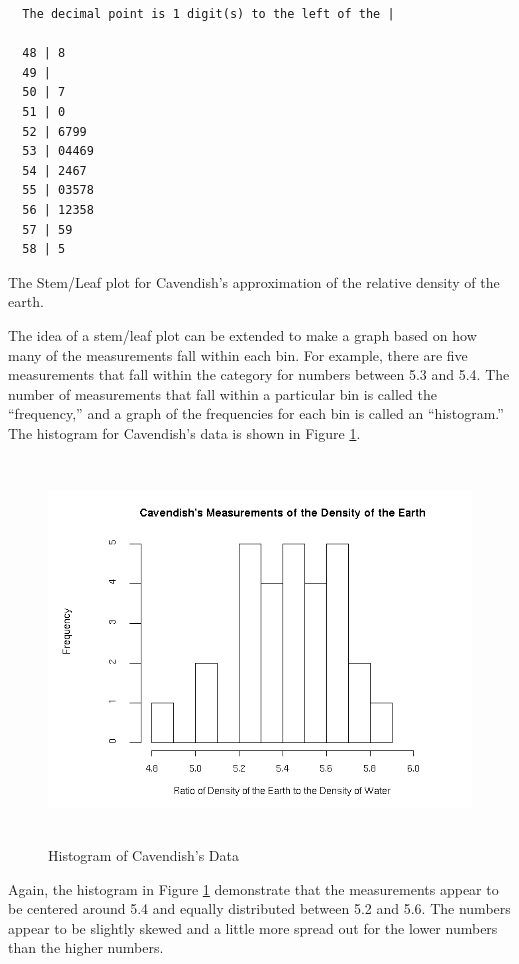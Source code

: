 \documentclass[12pt]{article}
\begin{document}
\begin{table}
  \centering
\begin{verbatim}
  The decimal point is 1 digit(s) to the left of the |

  48 | 8
  49 | 
  50 | 7
  51 | 0
  52 | 6799
  53 | 04469
  54 | 2467
  55 | 03578
  56 | 12358
  57 | 59
  58 | 5
\end{verbatim}
  \caption{The Stem/Leaf plot for Cavendish's approximation of the relative density of the earth. }
  \label{tab:cavendishStemLeaf}
\end{table}


The idea of a stem/leaf plot can be extended to make a graph based on
how many of the measurements fall within each bin. For example, there
are five measurements that fall within the category for numbers
between 5.3 and 5.4. The number of measurements that fall within a
particular bin is called the ``frequency,'' and a graph of the
frequencies for each bin is called an ``histogram.'' The histogram for
Cavendish's data is shown in Figure \ref{fig:cavHist}.

\begin{figure}[tb]
  \centerline{\includegraphics[height=4in]{cavHist}} %
  \caption{Histogram of Cavendish's Data}
  \label{fig:cavHist}
\end{figure}

Again, the histogram in Figure \ref{fig:cavHist} demonstrate that the
measurements appear to be centered around 5.4 and equally distributed
between 5.2 and 5.6. The numbers appear to be slightly skewed and a
little more spread out for the lower numbers than the higher numbers.
\end{document}
